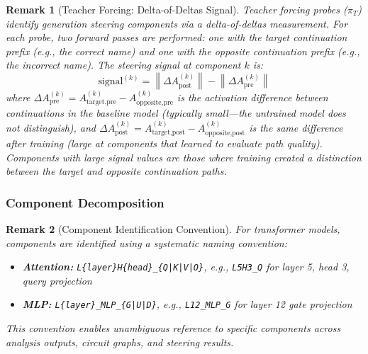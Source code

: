 \documentclass[11pt]{article}
\newtheorem{remark}{Remark}[section]
\begin{document}
\begin{remark}[Teacher Forcing: Delta-of-Deltas Signal]
\label{rem:teacher-forcing-delta-of-deltas}
Teacher forcing probes ($\pi_T$) identify generation steering components via a delta-of-deltas measurement. For each probe, two forward passes are performed: one with the target continuation prefix (e.g., the correct name) and one with the opposite continuation prefix (e.g., the incorrect name). The steering signal at component $k$ is:
\begin{equation}
\text{signal}^{(k)} = \left\|\Delta A^{(k)}_{\text{post}}\right\| - \left\|\Delta A^{(k)}_{\text{pre}}\right\|
\end{equation}
where $\Delta A^{(k)}_{\text{pre}} = A^{(k)}_{\text{target,pre}} - A^{(k)}_{\text{opposite,pre}}$ is the activation difference between continuations in the baseline model (typically small---the untrained model does not distinguish), and $\Delta A^{(k)}_{\text{post}} = A^{(k)}_{\text{target,post}} - A^{(k)}_{\text{opposite,post}}$ is the same difference after training (large at components that learned to evaluate path quality). Components with large signal values are those where training created a distinction between the target and opposite continuation paths.
\end{remark}

\subsubsection{Component Decomposition}
\label{sec:llm-component-decomposition}

\begin{remark}[Component Identification Convention]
\label{rem:component-identification-convention}
For transformer models, components are identified using a systematic naming convention:
\begin{itemize}[nosep]
\item \textbf{Attention:} \texttt{L\{layer\}H\{head\}\_\{Q|K|V|O\}}, e.g., \texttt{L5H3\_Q} for layer 5, head 3, query projection
\item \textbf{MLP:} \texttt{L\{layer\}\_MLP\_\{G|U|D\}}, e.g., \texttt{L12\_MLP\_G} for layer 12 gate projection
\end{itemize}
This convention enables unambiguous reference to specific components across analysis outputs, circuit graphs, and steering results.
\end{remark}
\end{document}
